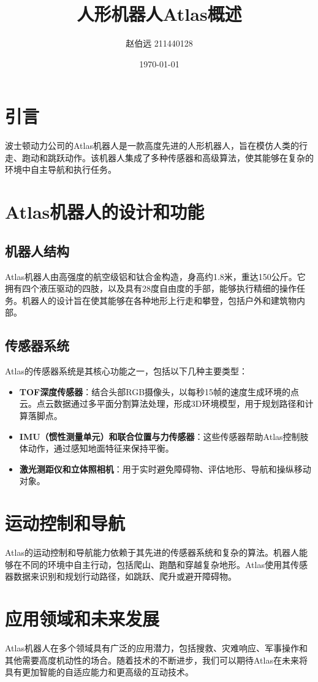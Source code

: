 \documentclass[UTF8,titlepage]{ctexart}
\numberwithin{figure}{section}
\begin{document}
\title{人形机器人Atlas概述}
\author{赵伯远 211440128}
\date{\today}
\maketitle
\section{引言}
波士顿动力公司的Atlas机器人是一款高度先进的人形机器人，旨在模仿人类的行走、跑动和跳跃动作。该机器人集成了多种传感器和高级算法，使其能够在复杂的环境中自主导航和执行任务。

\section{Atlas机器人的设计和功能}
\subsection{机器人结构}
Atlas机器人由高强度的航空级铝和钛合金构造，身高约1.8米，重达150公斤。它拥有四个液压驱动的四肢，以及具有28度自由度的手部，能够执行精细的操作任务。机器人的设计旨在使其能够在各种地形上行走和攀登，包括户外和建筑物内部。

\subsection{传感器系统}
Atlas的传感器系统是其核心功能之一，包括以下几种主要类型：
\begin{itemize}
    \item \textbf{TOF深度传感器}：结合头部RGB摄像头，以每秒15帧的速度生成环境的点云。点云数据通过多平面分割算法处理，形成3D环境模型，用于规划路径和计算落脚点。
    \item \textbf{IMU（惯性测量单元）和联合位置与力传感器}：这些传感器帮助Atlas控制肢体动作，通过感知地面特征来保持平衡。
    \item \textbf{激光测距仪和立体照相机}：用于实时避免障碍物、评估地形、导航和操纵移动对象。
\end{itemize}

\section{运动控制和导航}
Atlas的运动控制和导航能力依赖于其先进的传感器系统和复杂的算法。机器人能够在不同的环境中自主行动，包括爬山、跑酷和穿越复杂地形。Atlas使用其传感器数据来识别和规划行动路径，如跳跃、爬升或避开障碍物。

\section{应用领域和未来发展}
Atlas机器人在多个领域具有广泛的应用潜力，包括搜救、灾难响应、军事操作和其他需要高度机动性的场合。随着技术的不断进步，我们可以期待Atlas在未来将具有更加智能的自适应能力和更高级的互动技术。
\end{document}
